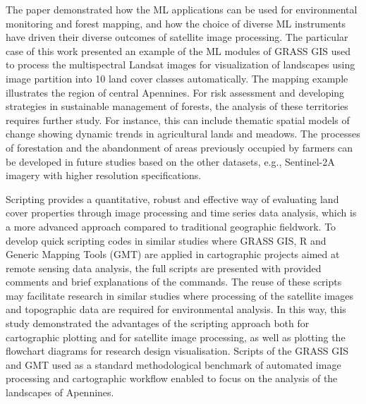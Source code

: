 \documentclass[jimaging,article,submit,pdftex,moreauthors]{Definitions/mdpi}
\begin{document}
The paper demonstrated how the ML applications can be used for environmental monitoring and forest mapping, and how the choice of diverse ML instruments have driven their diverse outcomes of satellite image processing. The particular case of this work presented an example of the ML modules of GRASS GIS used to process the multispectral Landsat images for visualization of landscapes using image partition into 10 land cover classes automatically. The mapping example illustrates the region of central Apennines. For risk assessment and developing strategies in sustainable management of forests, the analysis of these territories requires further study. For instance, this can include thematic spatial models of change showing dynamic trends in agricultural lands and meadows. The processes of forestation and the abandonment of areas previously occupied by farmers can be developed in future studies based on the other datasets, e.g., Sentinel-2A imagery with higher resolution specifications.

Scripting provides a quantitative, robust and effective way of evaluating land cover properties through image processing and time series data analysis, which is a more advanced approach compared to traditional geographic fieldwork. To develop quick scripting codes in similar studies where GRASS GIS, R and Generic Mapping Tools (GMT) are applied in cartographic projects aimed at remote sensing data analysis, the full scripts are presented with provided comments and brief explanations of the commands. The reuse of these scripts may facilitate research in similar studies where processing of the satellite images and topographic data are required for environmental analysis. In this way, this study demonstrated the advantages of the scripting approach both for cartographic plotting and for satellite image processing, as well as plotting the flowchart diagrams for research design visualisation. Scripts of the GRASS GIS and GMT used as a standard methodological benchmark of automated image processing and cartographic workflow enabled to focus on the analysis of the landscapes of Apennines. 
\end{document}
